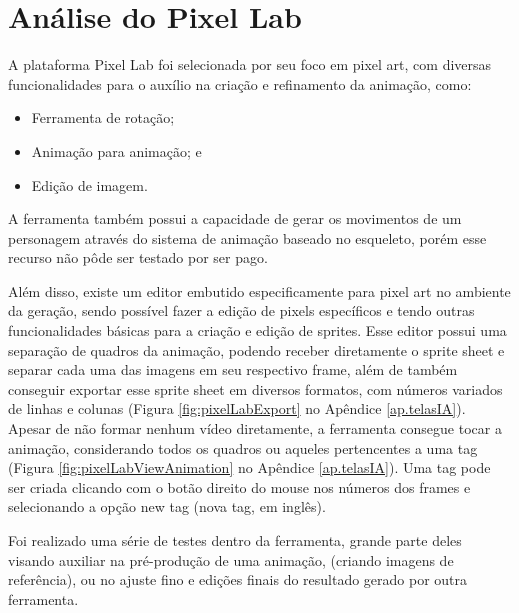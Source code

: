 \FloatBarrier
\section{Análise do Pixel Lab}
\label{s.pixelLab}

A plataforma Pixel Lab foi selecionada por seu foco em pixel art, com diversas funcionalidades para o auxílio na criação e refinamento da animação, como:

\begin{itemize}
    \item Ferramenta de rotação;
    \item Animação para animação; e
    \item Edição de imagem.
\end{itemize}


A ferramenta também possui a capacidade de gerar os movimentos de um personagem através do sistema de animação baseado no esqueleto, porém esse recurso não pôde ser testado por ser pago. 

Além disso, existe um editor embutido especificamente para pixel art no ambiente da geração, sendo possível fazer a edição de pixels específicos e tendo outras funcionalidades básicas para a criação e edição de sprites. Esse editor possui uma separação de quadros da animação, podendo receber diretamente o sprite sheet e separar cada uma das imagens em seu respectivo frame, além de também conseguir exportar esse sprite sheet em diversos formatos, com números variados de linhas e colunas (Figura \ref{fig:pixelLabExport} no Apêndice \ref{ap.telasIA}). Apesar de não formar nenhum vídeo diretamente, a ferramenta consegue tocar a animação, considerando todos os quadros ou aqueles pertencentes a uma tag (Figura \ref{fig:pixelLabViewAnimation} no Apêndice \ref{ap.telasIA}). Uma tag pode ser criada clicando com o botão direito do mouse nos números dos frames e selecionando a opção new tag (nova tag, em inglês).

Foi realizado uma série de testes dentro da ferramenta, grande parte deles visando auxiliar na pré-produção de uma animação, (criando imagens de referência), ou no ajuste fino e edições finais do resultado gerado por outra ferramenta.


